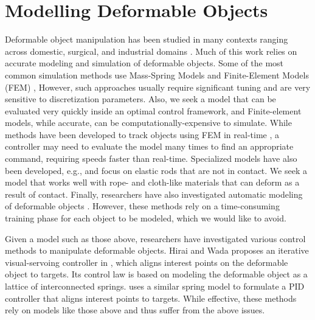 \section{Modelling Deformable Objects}

Deformable object manipulation has been studied in many contexts ranging across domestic, surgical, and industrial domains \cite{Jimenez2012}. Much of this work relies on accurate modeling and simulation of deformable objects. Some of the most common simulation methods use Mass-Spring Models \cite{Essahbi2012, Maris2010} and Finite-Element Models (FEM) \cite{Muller2002}, However, such approaches usually require significant tuning and are very sensitive to discretization parameters. Also, we seek a model that can be evaluated very quickly inside an optimal control framework, and Finite-element models, while accurate, can be computationally-expensive to simulate. While methods have been developed to track objects using FEM in real-time \cite{Petit2017}, a controller may need to evaluate the model many times to find an appropriate command, requiring speeds faster than real-time. Specialized models have also been developed, e.g., \cite{Borum2014} and \cite{Bretl2014} focus on elastic rods that are not in contact. We seek a model that works well with rope- and cloth-like materials that can deform as a result of contact. Finally, researchers have also investigated automatic modeling of deformable objects \cite{Lang2002, Cretu2008}. However, these methods rely on a time-consuming training phase for each object to be modeled, which we would like to avoid.%

Given a model such as those above, researchers have investigated various control methods to manipulate deformable objects. %
Hirai and Wada proposes an iterative visual-servoing controller in \cite{Hirai2000}, which aligns interest points on the deformable object to targets. 
Its control law is based on modeling the deformable object as a lattice of interconnected springs. 
\cite{Wada2001} uses a similar spring model to formulate a PID controller that aligns interest points to targets. While effective, these methods rely on models like those above and thus suffer from the above issues.



